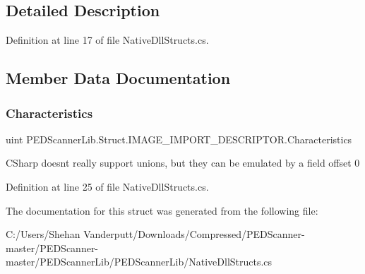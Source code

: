 \subsection{Detailed Description}


Definition at line 17 of file Native\+Dll\+Structs.\+cs.



\subsection{Member Data Documentation}
\mbox{\label{struct_p_e_d_scanner_lib_1_1_struct_1_1_i_m_a_g_e___i_m_p_o_r_t___d_e_s_c_r_i_p_t_o_r_a0c18d74dd3bc723eae566f0a1bc51054}} 
\subsubsection{\texorpdfstring{Characteristics}{Characteristics}}
{\footnotesize\ttfamily uint P\+E\+D\+Scanner\+Lib.\+Struct.\+I\+M\+A\+G\+E\+\_\+\+I\+M\+P\+O\+R\+T\+\_\+\+D\+E\+S\+C\+R\+I\+P\+T\+O\+R.\+Characteristics}



C\+Sharp doesnt really support unions, but they can be emulated by a field offset 0 



Definition at line 25 of file Native\+Dll\+Structs.\+cs.



The documentation for this struct was generated from the following file\+:\begin{DoxyCompactItemize}
\item 
C\+:/\+Users/\+Shehan Vanderputt/\+Downloads/\+Compressed/\+P\+E\+D\+Scanner-\/master/\+P\+E\+D\+Scanner-\/master/\+P\+E\+D\+Scanner\+Lib/\+P\+E\+D\+Scanner\+Lib/Native\+Dll\+Structs.\+cs\end{DoxyCompactItemize}
